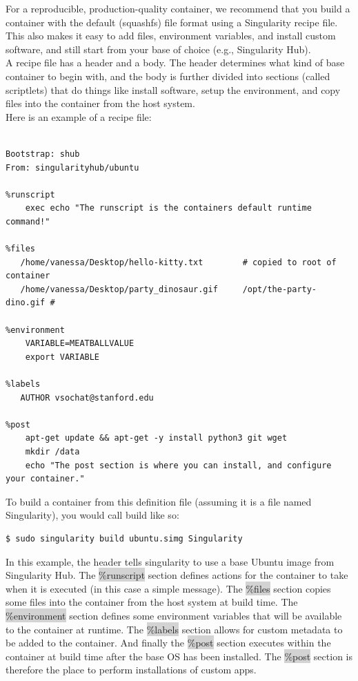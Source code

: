 \documentclass[a4paper]{article}
\begin{document}
For a reproducible, production-quality container, we recommend that you build a container with the default (squashfs) file format using a Singularity recipe file. This also makes it easy to add files, environment variables, and install custom software, and still start from your base of choice (e.g., Singularity Hub).\\

A recipe file has a header and a body. The header determines what kind of base container to begin with, and the body is further divided into sections (called scriptlets) that do things like install software, setup the environment, and copy files into the container from the host system.\\

Here is an example of a recipe file:
\begin{lstlisting}[frame=single]

Bootstrap: shub
From: singularityhub/ubuntu

%runscript
    exec echo "The runscript is the containers default runtime command!"

%files
   /home/vanessa/Desktop/hello-kitty.txt        # copied to root of container
   /home/vanessa/Desktop/party_dinosaur.gif     /opt/the-party-dino.gif #

%environment
    VARIABLE=MEATBALLVALUE
    export VARIABLE

%labels
   AUTHOR vsochat@stanford.edu

%post
    apt-get update && apt-get -y install python3 git wget
    mkdir /data
    echo "The post section is where you can install, and configure your container."

\end{lstlisting}

To build a container from this definition file (assuming it is a file named Singularity), you would call build like so:

\begin{lstlisting}[frame=single]
$ sudo singularity build ubuntu.simg Singularity
\end{lstlisting}

In this example, the header tells singularity to use a base Ubuntu image from Singularity Hub. The \colorbox{lightgray}{\%runscript} section defines actions for the container to take when it is executed (in this case a simple message). The \colorbox{lightgray}{\%files} section copies some files into the container from the host system at build time. The \colorbox{lightgray}{\%environment} section defines some environment variables that will be available to the container at runtime. The \colorbox{lightgray}{\%labels} section allows for custom metadata to be added to the container. And finally the \colorbox{lightgray}{\%post} section executes within the container at build time after the base OS has been installed. The \colorbox{lightgray}{\%post} section is therefore the place to perform installations of custom apps.\\
\end{document}
